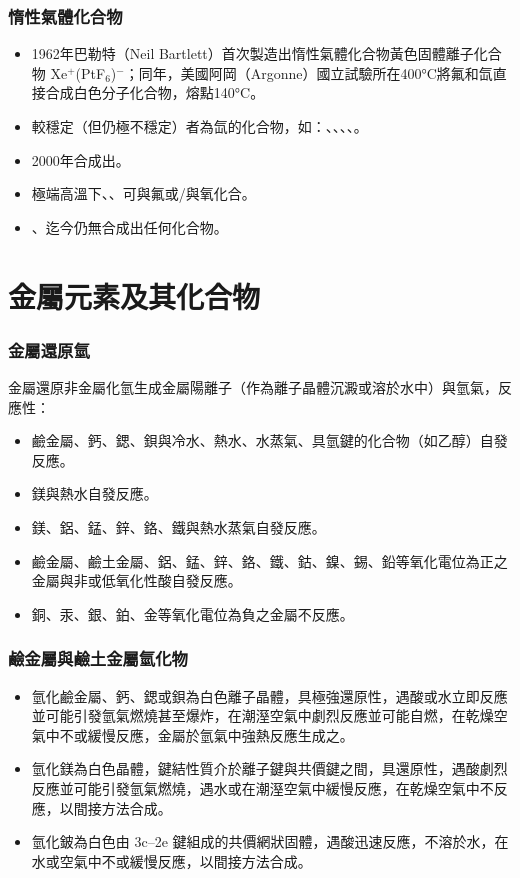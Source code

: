\documentclass[a4paper,12pt]{report}
\begin{document}
\begin{itemize}
\begin{itemize}
\subsubsection{惰性氣體化合物}
\begin{itemize}
\item 1962年巴勒特（Neil Bartlett）首次製造出惰性氣體化合物黃色固體離子化合物 Xe$^+$(PtF$_6$)$^-$；同年，美國阿岡（Argonne）國立試驗所在400°C將氟和氙直接合成白色分子化合物，熔點140°C。
\item 較穩定（但仍極不穩定）者為氙的化合物，如：、、、、。
\item 2000年合成出。
\item 極端高溫下、、可與氟或/與氧化合。
\item {}、迄今仍無合成出任何化合物。
\end{itemize}


\section{金屬元素及其化合物}
\subsubsection{金屬還原氫}
金屬還原非金屬化氫生成金屬陽離子（作為離子晶體沉澱或溶於水中）與氫氣，反應性：
\begin{itemize}
\item 鹼金屬、鈣、鍶、鋇與冷水、熱水、水蒸氣、具氫鍵的化合物（如乙醇）自發反應。
\item 鎂與熱水自發反應。
\item 鎂、鋁、錳、鋅、鉻、鐵與熱水蒸氣自發反應。
\item 鹼金屬、鹼土金屬、鋁、錳、鋅、鉻、鐵、鈷、鎳、錫、鉛等氧化電位為正之金屬與非或低氧化性酸自發反應。
\item 銅、汞、銀、鉑、金等氧化電位為負之金屬不反應。
\end{itemize}
\subsubsection{鹼金屬與鹼土金屬氫化物}
\begin{itemize}
\item 氫化鹼金屬、鈣、鍶或鋇為白色離子晶體，具極強還原性，遇酸或水立即反應並可能引發氫氣燃燒甚至爆炸，在潮溼空氣中劇烈反應並可能自燃，在乾燥空氣中不或緩慢反應，金屬於氫氣中強熱反應生成之。
\item 氫化鎂為白色晶體，鍵結性質介於離子鍵與共價鍵之間，具還原性，遇酸劇烈反應並可能引發氫氣燃燒，遇水或在潮溼空氣中緩慢反應，在乾燥空氣中不反應，以間接方法合成。
\item 氫化鈹為白色由 3c–2e 鍵組成的共價網狀固體，遇酸迅速反應，不溶於水，在水或空氣中不或緩慢反應，以間接方法合成。
\end{itemize}

\end{itemize}
\end{itemize}
\end{document}
